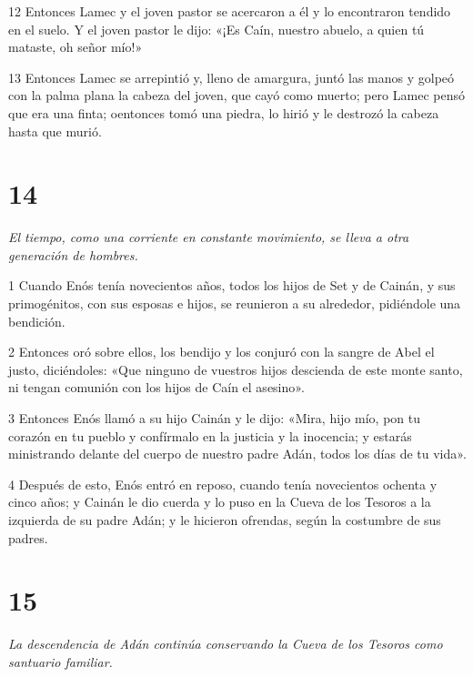 \par 12 Entonces Lamec y el joven pastor se acercaron a él y lo encontraron tendido en el suelo. Y el joven pastor le dijo: «¡Es Caín, nuestro abuelo, a quien tú mataste, oh señor mío!»

\par 13 Entonces Lamec se arrepintió y, lleno de amargura, juntó las manos y golpeó con la palma plana la cabeza del joven, que cayó como muerto; pero Lamec pensó que era una finta; oentonces tomó una piedra, lo hirió y le destrozó la cabeza hasta que murió.

\chapter{14}

\par \textit{El tiempo, como una corriente en constante movimiento, se lleva a otra generación de hombres.}

\par 1 Cuando Enós tenía novecientos años, todos los hijos de Set y de Cainán, y sus primogénitos, con sus esposas e hijos, se reunieron a su alrededor, pidiéndole una bendición.

\par 2 Entonces oró sobre ellos, los bendijo y los conjuró con la sangre de Abel el justo, diciéndoles: «Que ninguno de vuestros hijos descienda de este monte santo, ni tengan comunión con los hijos de Caín el asesino».

\par 3 Entonces Enós llamó a su hijo Cainán y le dijo: «Mira, hijo mío, pon tu corazón en tu pueblo y confírmalo en la justicia y la inocencia; y estarás ministrando delante del cuerpo de nuestro padre Adán, todos los días de tu vida».

\par 4 Después de esto, Enós entró en reposo, cuando tenía novecientos ochenta y cinco años; y Cainán le dio cuerda y lo puso en la Cueva de los Tesoros a la izquierda de su padre Adán; y le hicieron ofrendas, según la costumbre de sus padres.

\chapter{15}

\par \textit{La descendencia de Adán continúa conservando la Cueva de los Tesoros como santuario familiar.}

